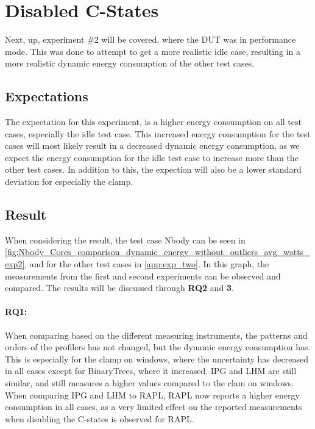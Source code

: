 \section{Disabled C-States}

Next, up, experiment \#2 will be covered, where the DUT was in performance mode. This was done to attempt to get a more realistic idle case, resulting in a more realistic dynamic energy consumption of the other test cases.

\subsection{Expectations} 

The expectation for this experiment, is a higher energy consumption on all test cases, especially the idle test case. This increased energy consumption for the test cases will most likely result in a decreased dynamic energy consumption, as we expect the energy consumption for the idle test case to increase more than the other test cases. In addition to this, the expection will also be a lower standard deviation for especially the clamp.

\subsection{Result} 
When considering the result, the test case Nbody can be seen in \cref{fig:Nbody_Cores_comparison_dynamic_energy_without_outliers_avg_watts_exp2}, and for the other test cases in \cref{app:exp_two}. In this graph, the measurements from the first and second experiments can be observed and compared. The results will be discussed through \textbf{RQ2} and \textbf{3}.

\paragraph*{RQ1:} When comparing based on the different measuring instruments, the patterns and orders of the profilers has not changed, but the dynamic energy consumption has. This is especially for the clamp on windows, where the uncertainty has decreased in all cases except for BinaryTrees, where it increased. IPG and LHM are still similar, and still measures a higher values compared to the clam on windows. When comparing IPG and LHM to RAPL, RAPL now reports a higher energy consumption in all cases, as a very limited effect on the reported measurements when disabling the C-states is observed for RAPL.


